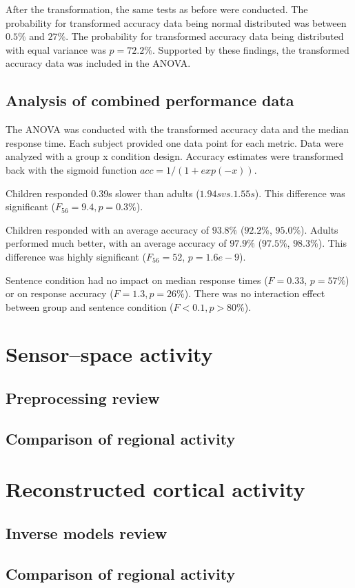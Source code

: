 After the transformation, the same tests as before were conducted.
The probability for transformed accuracy data being normal distributed was between $0.5\%$ and $27\%$.
The probability for transformed accuracy data being distributed with equal variance was $p = 72.2\%$.
Supported by these findings, the transformed accuracy data was included in the ANOVA.

\subsection{Analysis of combined performance data}

The ANOVA was conducted with the transformed accuracy data and the median response time.
Each subject provided one data point for each metric.
Data were analyzed with a group x condition design.
Accuracy estimates were transformed back with the sigmoid function $acc = 1/(1+exp(-x))$.

Children responded 0.39s slower than adults ($1.94s vs. 1.55s$).
This difference was significant ($F_56 = 9.4, p = 0.3\%$).

Children responded with an average accuracy of $93.8\%$ ($92.2\%$, $95.0\%$).
Adults performed much better, with an average accuracy of $97.9\%$ ($97.5\%$, $98.3\%$).
This difference was highly significant ($F_56 = 52$, $p = 1.6e-9$).

Sentence condition had no impact on median response times ($F = 0.33$, $p = 57\%$) or on response accuracy ($F = 1.3, p = 26\%$).
There was no interaction effect between group and sentence condition ($F < 0.1, p > 80\%$).




\section{Sensor--space activity}

\subsection{Preprocessing review}
\subsection{Comparison of regional activity}

\section{Reconstructed cortical activity}
\subsection{Inverse models review}
\subsection{Comparison of regional activity}


